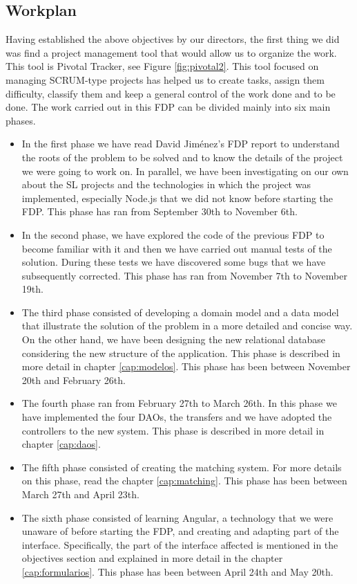 \documentclass[11pt]{book}
\begin{document}
\begin{itemize}
\section{Workplan}
Having established the above objectives by our directors, the first thing we did was find a project management tool that would allow us to organize the work. This tool is Pivotal Tracker, see Figure \ref {fig:pivotal2}. This tool focused on managing SCRUM-type projects has helped us to create tasks, assign them difficulty, classify them and keep a general control of the work done and to be done. The work carried out in this FDP can be divided mainly into six main phases.
\begin{itemize} 
	\item In the first phase we have read David Jiménez's FDP report to understand the roots of the problem to be solved and to know the details of the project we were going to work on. In parallel, we have been investigating on our own about the SL projects and the technologies in which the project was implemented, especially Node.js that we did not know before starting the FDP. This phase has ran from September 30th to November 6th.
	\item In the second phase, we have explored the code of the previous FDP to become familiar with it and then we have carried out manual tests of the solution. During these tests we have discovered some bugs that we have subsequently corrected. This phase has ran from November 7th to November 19th.
	\item The third phase consisted of developing a domain model and a data model that illustrate the solution of the problem in a more detailed and concise way. On the other hand, we have been designing the new relational database considering the new structure of the application. This phase is described in more detail in chapter \ref{cap:modelos}. This phase has been between November 20th and February 26th.
	\item The fourth phase ran from February 27th to March 26th. In this phase we have implemented the four DAOs, the transfers and we have adopted the controllers to the new system. This phase is described in more detail in chapter \ref {cap:daos}.
	\item The fifth phase consisted of creating the matching system. For more details on this phase, read the chapter \ref{cap:matching}. This phase has been between March 27th and April 23th.
	\item The sixth phase consisted of learning Angular, a technology that we were unaware of before starting the FDP, and creating and adapting part of the interface. Specifically, the part of the interface affected is mentioned in the objectives section and explained in more detail in the chapter \ref {cap:formularios}. This phase has been between April 24th and May 20th.
	
\end{itemize}

\end{itemize}
\end{document}
